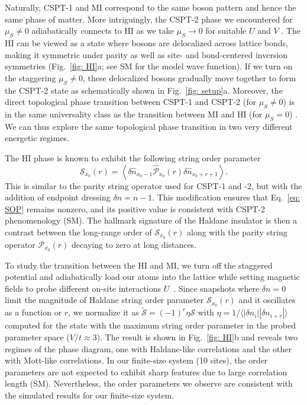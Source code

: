 \documentclass[preprint,superscriptaddress,floatfix, nofootinbib]{revtex4-2}
\begin{document}
Naturally, CSPT-1 and MI correspond to the same boson pattern and hence the same phase of matter. More intriguingly, the CSPT-2 phase we encountered for $\mu_S \neq 0$ adiabatically connects to HI as we take $\mu_S \to 0$ for suitable $U$ and $V$ \cite{Fuji2015}.
%
The HI can be viewed as a state where bosons are delocalized across lattice bonds, making it symmetric under parity as well as site- and bond-centered inversion symmetries (Fig.~\ref{fig: HI}a; see SM for the model wave function).
If we turn on the staggering $\mu_S \neq 0$, these delocalized bosons gradually move together to form the CSPT-2 state as schematically shown in Fig.~\ref{fig: setup}a.
%
Moreover, the direct topological phase transition between CSPT-1 and CSPT-2 (for $\mu_S \neq 0$) is in the same universality class as the transition between MI and HI (for $\mu_S = 0$) \cite{Sahay2025}.
%
We can thus explore the same topological phase transition in two very different energetic regimes.

The HI phase is known to exhibit the following string order parameter~\cite{Nijs1989, Pollmann2012Detection}
\begin{equation}
\label{eq: SOP}
\mathcal{S}_{x_0} (r)=\left\langle\delta \hat n_{x_0 -1} \hat{\mathcal{P}}_{x_0}(r)\delta \hat n_{x_0+r + 1}\right\rangle.
\end{equation}
This is similar to the parity string operator used for CSPT-1 and -2, but with the addition of endpoint dressing $\delta n = n - 1$. This modification ensures that Eq.~\eqref{eq: SOP} remains nonzero, and its positive value is consistent with CSPT-2 phenomenology (SM).
%
The hallmark signature of the Haldane insulator is then a contrast between the long-range order of $\mathcal{S}_{x_0}(r)$ along with the parity string operator $\mathcal{P}_{x_0}(r)$ decaying to zero at long distances.
%

To study the transition between the HI and MI, we turn off the staggered potential and adiabatically load our atoms into the lattice while setting magnetic fields to probe different on-site interactions $U$~\cite{Patscheider2022}.
%
Since snapshots where $\delta n = 0$ limit the magnitude of Haldane string order parameter $\mathcal{S}_{x_0}(r)$ and it oscillates as a function or $r$, we normalize it as $\widetilde{\mathcal{S}} =  (-1)^{r}\eta \mathcal{S}$ with $\eta=1/\langle |\delta n_i||\delta n_{i+r}|\rangle$~\cite{Sompet2022} computed for the state with the maximum string order parameter in the probed parameter space ($V/t \approx 3$).
%
The result is shown in Fig.~\ref{fig: HI}b and reveals two regimes of the phase diagram, one with Haldane-like correlations and the other with Mott-like correlations.
%
In our finite-size system (10 sites), the order parameters are not expected to exhibit sharp features due to large correlation length (SM).
%
Nevertheless, the order parameters we observe are consistent with the simulated results for our finite-size system.
\end{document}

